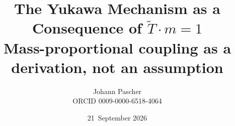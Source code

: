 \documentclass[11pt,a4paper]{report}
\title{The Yukawa Mechanism as a Consequence of $\tilde T\cdot m=1$\\[0.5em]\large Mass-proportional coupling as a derivation, not an assumption}
\date{21~September 2026}
\author{Johann Pascher\\\small ORCID 0009-0000-6518-4064}
\begin{document}
\renewcommand{\thechapter}{}
\renewcommand{\thesection}{\arabic{section}}
\maketitle
\tableofcontents

\end{document}
